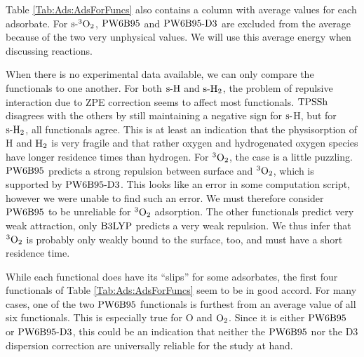 Table \ref{Tab:Ads:AdsForFuncs} also contains a column with average values
for each adsorbate.
For $\text{s-}{^3\ensuremath{\text O_2}}$, $\text{PW6B95}$ and $\text{PW6B95}\text{-D3}$ are excluded from the average because of
the two very unphysical values. We will use this average energy
when discussing reactions.

When there is no experimental data available, we can only compare the
functionals to one another. For both $\text{s-}\text H$ and $\text{s-}\text H_2$, the
problem of repulsive interaction due to ZPE correction seems to affect
most functionals. $\text{TPSSh}$ disagrees with the others by still maintaining
a negative sign for $\text{s-}$H, but for $\text{s-}\text H_2$, all functionals agree.
This is at least an indication that the physisorption of H and $\text H_2$ is
very fragile and that rather oxygen and hydrogenated oxygen species
have longer residence times than hydrogen.
For ${^3\text O_2}$, the case is a little puzzling. $\text{PW6B95}$ predicts a strong
repulsion between surface and ${^3\text O_2}$, which is supported by
$\text{PW6B95}\text{-D3}$. This looks like an error in some computation script, however we were
unable to find such an error. We must therefore consider $\text{PW6B95}$
to be unreliable for ${^3\text O_2}$ adsorption. The other
functionals predict very weak attraction, only $\text{B3LYP}$ predicts
a very weak repulsion. We thus infer that ${^3\text O_2}$ is
probably only weakly bound to the surface, too, and must have a short
residence time.

While each functional does have its ``slips'' for some adsorbates, the first four functionals of
Table \ref{Tab:Ads:AdsForFuncs} seem to be in good accord. 
For many cases, one of the two $\text{PW6B95}$ functionals is furthest from an average
value of all six functionals. This is especially true for O and $\text O_2$.
Since it is either $\text{PW6B95}$ or $\text{PW6B95}\text{-D3}$, this could be an indication
that neither the $\text{PW6B95}$ nor the D3 dispersion correction are universally
reliable for the study at hand.

